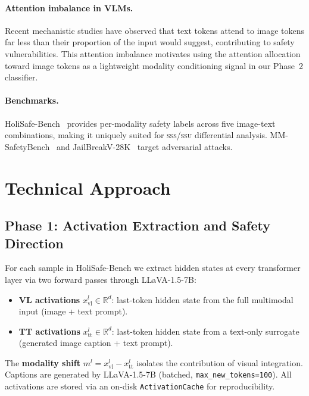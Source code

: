\documentclass{article}
\newcommand{\xvl}{x_{\text{vl}}}
\newcommand{\xtt}{x_{\text{tt}}}
\newcommand{\ml}{m^l}
\begin{document}
\paragraph{Attention imbalance in VLMs.}
Recent mechanistic studies have observed that text tokens attend to image tokens far less
than their proportion of the input would suggest, contributing to safety vulnerabilities.
This attention imbalance motivates using the attention allocation toward image tokens as a
lightweight modality conditioning signal in our Phase~2 classifier.

\paragraph{Benchmarks.}
HoliSafe-Bench~\cite{lee2025holisafe} provides per-modality safety labels across five
image-text combinations, making it uniquely suited for \textsc{sss}/\textsc{ssu} differential
analysis.
MM-SafetyBench~\cite{liu2024mmsafetybench} and
JailBreakV-28K~\cite{luo2024jailbreakv} target adversarial attacks.


\section{Technical Approach}

\subsection{Phase 1: Activation Extraction and Safety Direction}

For each sample in HoliSafe-Bench we extract hidden states at every transformer layer via
two forward passes through LLaVA-1.5-7B:
\begin{itemize}[noitemsep]
  \item \textbf{VL activations} $\xvl^l \in \mathbb{R}^d$: last-token hidden state from
        the full multimodal input (image + text prompt).
  \item \textbf{TT activations} $\xtt^l \in \mathbb{R}^d$: last-token hidden state from
        a text-only surrogate (generated image caption + text prompt).
\end{itemize}
The \textbf{modality shift} $\ml = \xvl^l - \xtt^l$ isolates the contribution of visual
integration.
Captions are generated by LLaVA-1.5-7B (batched, \texttt{max\_new\_tokens=100}).
All activations are stored via an on-disk \texttt{ActivationCache} for reproducibility.
\end{document}
